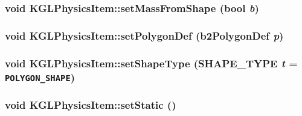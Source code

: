 \begin{CompactItemize}
\hypertarget{class_k_g_l_physics_item_8ccd7feacbfc2c4e6d035bc147138cde}{
\subsubsection[{setMassFromShape}]{\setlength{\rightskip}{0pt plus 5cm}void KGLPhysicsItem::setMassFromShape (bool {\em b})}}
\label{class_k_g_l_physics_item_8ccd7feacbfc2c4e6d035bc147138cde}


\hypertarget{class_k_g_l_physics_item_a492016cac88405f5988d891c838c2d6}{
\subsubsection[{setPolygonDef}]{\setlength{\rightskip}{0pt plus 5cm}void KGLPhysicsItem::setPolygonDef (b2PolygonDef {\em p})}}
\label{class_k_g_l_physics_item_a492016cac88405f5988d891c838c2d6}


\hypertarget{class_k_g_l_physics_item_8c86227c571bfa83e6aefbaa1ef573df}{
\subsubsection[{setShapeType}]{\setlength{\rightskip}{0pt plus 5cm}void KGLPhysicsItem::setShapeType ({\bf SHAPE\_\-TYPE} {\em t} = {\tt POLYGON\_\-SHAPE})}}
\label{class_k_g_l_physics_item_8c86227c571bfa83e6aefbaa1ef573df}


\hypertarget{class_k_g_l_physics_item_10f8810cfd4018543a169df37a7a7cc1}{
\subsubsection[{setStatic}]{\setlength{\rightskip}{0pt plus 5cm}void KGLPhysicsItem::setStatic ()}}
\label{class_k_g_l_physics_item_10f8810cfd4018543a169df37a7a7cc1}



\end{CompactItemize}
